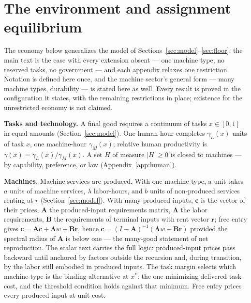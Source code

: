 \documentclass[12pt]{article}
\theoremstyle{plain}
\begin{document}
\appendix
{}

\section{The environment and assignment equilibrium}\label{app:environment}

The economy below generalizes the model of Sections~\ref{sec:model}--\ref{sec:floor}; the main text is the case with every extension absent --- one machine type, no reserved tasks, no government --- and each appendix relaxes one restriction. Notation is defined here once, and the machine sector's general form --- many machine types, durability --- is stated here as well. Every result is proved in the configuration it states, with the remaining restrictions in place; existence for the unrestricted economy is not claimed.

\textbf{Tasks and technology.} A final good requires a continuum of tasks $x\in[0,1]$ in equal amounts (Section~\ref{sec:model}). One human-hour completes $\gamma _L(x)$ units of task $x$, one machine-hour $\gamma _M(x)$; relative human productivity is $\gamma (x) = \gamma _L(x)/\gamma _M(x)$. A set $H$ of measure $|H| \ge 0$ is closed to machines --- by capability, preference, or law (Appendix~\ref{app:human}).

\textbf{Machines.} Machine services are produced. With one machine type, a unit takes $a$ units of machine services, $\lambda$ labor-hours, and $b$ units of non-produced services renting at $r$ (Section~\ref{sec:model}). With many produced inputs, $\mathbf{c}$ is the vector of their prices, $\mathbf{A}$ the produced-input requirements matrix, $\boldsymbol{\Lambda}$ the labor requirements, $\mathbf{B}$ the requirements of terminal inputs with rent vector $\mathbf{r}$; free entry gives $\mathbf{c} = \mathbf{A}\mathbf{c} + \boldsymbol{\Lambda}w + \mathbf{B}\mathbf{r}$, hence $\mathbf{c} = (I-\mathbf{A})^{-1}(\boldsymbol{\Lambda}w + \mathbf{B}\mathbf{r})$ provided the spectral radius of $\mathbf{A}$ is below one --- the many-good statement of net reproduction. The scalar text carries the full logic: produced-input prices pass backward until anchored by factors outside the recursion and, during transition, by the labor still embodied in produced inputs. The task margin selects which machine type is the binding alternative at $x^*$: the one minimizing delivered task cost, and the threshold condition holds against that minimum. Free entry prices every produced input at unit cost.
\end{document}
